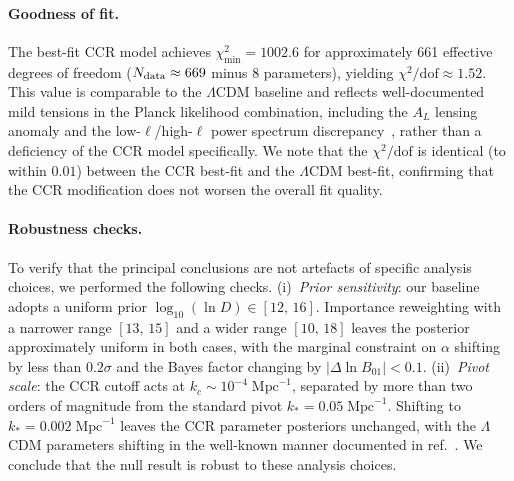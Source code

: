 \paragraph{Goodness of fit.}
The best-fit CCR model achieves $\chi^2_{\min} = 1002.6$ for
approximately 661 effective degrees of freedom
($N_{\rm data} \approx 669$ minus 8 parameters), yielding
$\chi^2/\mathrm{dof} \approx 1.52$.  This value is comparable to the $\Lambda$CDM 
baseline and reflects
well-documented mild tensions in the Planck likelihood combination,
including the $A_L$ lensing anomaly and the low-$\ell$/high-$\ell$
power spectrum discrepancy~\cite{Planck:2018likelihood,Planck:2018params},
rather than a deficiency of the CCR model specifically. We note that
the $\chi^2/\mathrm{dof}$ is identical (to within $0.01$) between the
CCR best-fit and the $\Lambda$CDM best-fit, confirming that the CCR
modification does not worsen the overall fit quality.

\paragraph{Robustness checks.}
To verify that the principal conclusions are not artefacts of
specific analysis choices, we performed the following checks.
%
(i)~\emph{Prior sensitivity}: our baseline adopts a uniform prior
$\log_{10}(\ln D) \in [12,\,16]$. Importance reweighting with a
narrower range $[13,\,15]$ and a wider range $[10,\,18]$ leaves the
posterior approximately uniform in both cases, with the marginal
constraint on $\alpha$ shifting by less than $0.2\sigma$ and the
Bayes factor changing by $|\Delta \ln B_{01}| < 0.1$.
%
(ii)~\emph{Pivot scale}: the CCR cutoff acts at
$k_c \sim 10^{-4}\;\mathrm{Mpc}^{-1}$, separated by more than two
orders of magnitude from the standard pivot
$k_* = 0.05\;\mathrm{Mpc}^{-1}$. Shifting to
$k_* = 0.002\;\mathrm{Mpc}^{-1}$ leaves the CCR parameter
posteriors unchanged, with the $\Lambda$CDM parameters shifting in
the well-known manner documented in
ref.~\cite{Planck:2018params}.
%
We conclude that the null result is robust to these analysis
choices.
